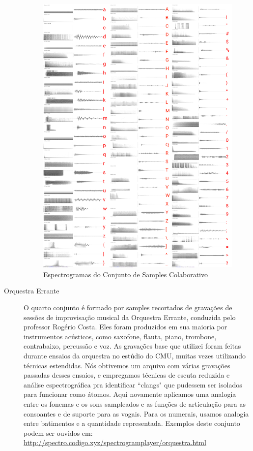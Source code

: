 \begin{description}
\begin{figure}
    \caption{\label{samplescolab}Espectrogramas do Conjunto de Samples Colaborativo}
    \begin{center}
        \includegraphics[width=1\linewidth]{pictures/cap3/bandaabertacolab.jpg}
    \end{center}
\end{figure}

\item[Orquestra Errante] O quarto conjunto é formado por samples recortados de gravações de sessões de improvisação musical da Orquestra Errante, conduzida pelo professor Rogério Costa. Eles foram produzidos em sua maioria por instrumentos acústicos, como saxofone, flauta, piano, trombone, contrabaixo, percussão e voz. As gravações base que utilizei foram feitas durante ensaios da orquestra no estúdio do CMU, muitas vezes utilizando técnicas estendidas. Nós obtivemos um arquivo com várias gravações passadas desses ensaios, e empregamos técnicas de escuta reduzida e análise espectrográfica pra identificar ``clangs" que pudessem ser isolados para funcionar como átomos. Aqui novamente aplicamos uma analogia entre os fonemas e os sons sampleados e as funções de articulação para as consoantes e de suporte para as vogais. Para os numerais, usamos analogia entre batimentos e a quantidade representada. Exemplos deste conjunto podem ser ouvidos em: \url{http://spectro.codigo.xyz/spectrogramplayer/orquestra.html}
\end{description}

